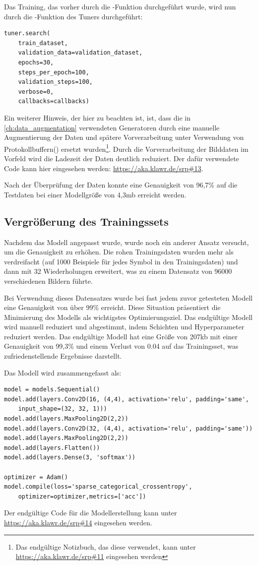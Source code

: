 Das Training, das vorher durch die -Funktion durchgeführt wurde, wird nun durch die -Funktion des Tuners durchgeführt:

\begin{lstlisting}
tuner.search(
    train_dataset,
    validation_data=validation_dataset,
    epochs=30,
    steps_per_epoch=100,
    validation_steps=100,
    verbose=0,
    callbacks=callbacks)
\end{lstlisting}

Ein weiterer Hinweis, der hier zu beachten ist, ist, dass die in \ref{ch:data_augmentation} verwendeten Generatoren durch eine manuelle Augmentierung der Daten und spätere Vorverarbeitung unter Verwendung von Protokollbuffern() ersetzt wurden\footnote{Das endgültige Notizbuch, das diese verwendet, kann unter \url{https://aka.klawr.de/srp\#11} eingesehen werden}.
Durch die Vorverarbeitung der Bilddaten im Vorfeld wird die Ladezeit der Daten deutlich reduziert.
Der dafür verwendete Code kann hier eingesehen werden: \url{https://aka.klawr.de/srp\#13}.

Nach der Überprüfung der Daten konnte eine Genauigkeit von 96,7\% auf die Testdaten bei einer Modellgröße von 4,3mb erreicht werden.

\subsection{Vergrößerung des Trainingssets}

Nachdem das Modell angepasst wurde, wurde noch ein anderer Ansatz versucht, um die Genauigkeit zu erhöhen.
Die rohen Trainingsdaten wurden mehr als verdreifacht (auf 1000 Beispiele für jedes Symbol in den Trainingsdaten) und dann mit 32 Wiederholungen erweitert, was zu einem Datensatz von 96000 verschiedenen Bildern führte.

Bei Verwendung dieses Datensatzes wurde bei fast jedem zuvor getesteten Modell eine Genauigkeit von über 99\% erreicht.
Diese Situation präsentiert die Minimierung des Modells als wichtigstes Optimierungsziel.
Das endgültige Modell wird manuell reduziert und abgestimmt, indem Schichten und Hyperparameter reduziert werden.
Das endgültige Modell hat eine Größe von 207kb mit einer Genauigkeit von 99,3\% und einem Verlust von 0.04 auf das Trainingsset, was zufriedenstellende Ergebnisse darstellt.

Das Modell wird zusammengefasst als:

\begin{lstlisting}
model = models.Sequential()
model.add(layers.Conv2D(16, (4,4), activation='relu', padding='same',
    input_shape=(32, 32, 1)))
model.add(layers.MaxPooling2D(2,2))
model.add(layers.Conv2D(32, (4,4), activation='relu', padding='same'))
model.add(layers.MaxPooling2D(2,2))
model.add(layers.Flatten())
model.add(layers.Dense(3, 'softmax'))

optimizer = Adam()
model.compile(loss='sparse_categorical_crossentropy',
    optimizer=optimizer,metrics=['acc'])
\end{lstlisting}

Der endgültige Code für die Modellerstellung kann unter \url{https://aka.klawr.de/srp\#14} eingesehen werden.

